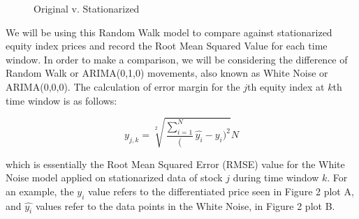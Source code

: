 \documentclass{article}[12pt]
\begin{document}
          \begin{figure}[htbp]
            \centering
            \hfill
            \caption{Original v. Stationarized}
          \end{figure}


        We will be using this Random Walk model to compare against stationarized equity index prices and record the Root Mean Squared Value for each time window. In order to make a comparison, we will be considering the difference of Random Walk or ARIMA(0,1,0) movements, also known as White Noise or ARIMA(0,0,0). The calculation of error margin for the $j$th equity index at $k$th time window is as follows:
          
        \[ y_{j,k} = \sqrt[2]{\frac{\sum_{i=1}^{N}} (\hat{y_i} - y_i)^{2}}{N} \]
          
        which is essentially the Root Mean Squared Error (RMSE) value for the White Noise model applied on stationarized data of stock $j$ during time window $k$. For an example, the $y_i$ value refers to the differentiated price seen in Figure 2 plot A, and $\hat{y_i}$ values refer to the data points in the White Noise, in Figure 2 plot B.
        
\end{document}
